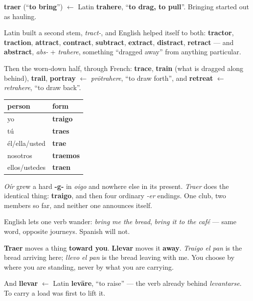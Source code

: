 \begin{cousinweb}
\textbf{traer} (\textquotedblleft{}\textbf{to bring}\textquotedblright{}) $\leftarrow$ Latin \textbf{trahere}, \textquotedblleft{}\textbf{to drag, to pull}\textquotedblright{}. Bringing started out as hauling.

Latin built a second stem, \emph{tract-}, and English helped itself to both: \textbf{tractor}, \textbf{traction}, \textbf{attract}, \textbf{contract}, \textbf{subtract}, \textbf{extract}, \textbf{distract}, \textbf{retract} — and \textbf{abstract}, \emph{abs-} + \emph{trahere}, something \textquotedblleft{}dragged away\textquotedblright{} from anything particular.

Then the worn-down half, through French: \textbf{trace}, \textbf{train} (what is dragged along behind), \textbf{trail}, \textbf{portray} $\leftarrow$ \emph{prōtrahere}, \textquotedblleft{}to draw forth\textquotedblright{}, and \textbf{retreat} $\leftarrow$ \emph{retrahere}, \textquotedblleft{}to draw back\textquotedblright{}.
\end{cousinweb}

\begin{grammarlens}[title={Grammar Lens: the hard g, for the second time}]
\noindent
\begin{tabularx}{\linewidth}{@{}>{\raggedright\arraybackslash}X>{\raggedright\arraybackslash}X@{}}
\toprule
\textbf{person} & \textbf{form} \\
\midrule
yo & \textbf{traigo} \\
tú & \textbf{traes} \\
él/ella/usted & \textbf{trae} \\
nosotros & \textbf{traemos} \\
ellos/ustedes & \textbf{traen} \\
\bottomrule
\end{tabularx}

\emph{Oír} grew a hard \textbf{-g-} in \emph{oigo} and nowhere else in its present. \emph{Traer} does the identical thing: \textbf{traigo}, and then four ordinary \emph{-er} endings. One club, two members so far, and neither one announces itself.
\end{grammarlens}

\begin{culture}
English lets one verb wander: \emph{bring me the bread}, \emph{bring it to the café} — same word, opposite journeys. Spanish will not.

\textbf{Traer} moves a thing \textbf{toward you}. \textbf{Llevar} moves it \textbf{away}. \emph{Traigo el pan} is the bread arriving here; \emph{llevo el pan} is the bread leaving with me. You choose by where you are standing, never by what you are carrying.

And \textbf{llevar} $\leftarrow$ Latin \textbf{levāre}, \textquotedblleft{}to raise\textquotedblright{} — the verb already behind \emph{levantarse}. To carry a load was first to lift it.
\end{culture}

